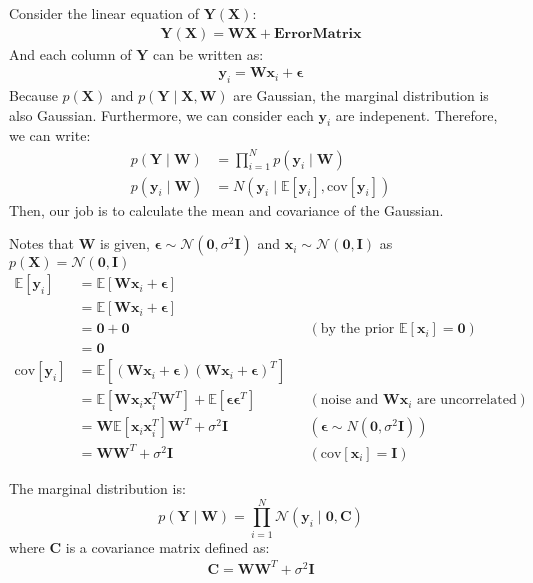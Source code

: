 \documentclass[12pt]{article}
\newenvironment{question}[2][Question]{\begin{trivlist}
\kern10pt
\item[\hskip \labelsep {\bfseries #1}\hskip \labelsep {\bfseries #2.}]}{\end{trivlist}}
\begin{document}
\begin{question}{13}
Consider the linear equation of $\mathbf{Y}(\mathbf{X})$:
  \begin{align*}
    \mathbf{Y}(\mathbf{X}) = \mathbf{W}\mathbf{X} + \bm{ErrorMatrix}
  \end{align*}
And each column of $\mathbf{Y}$ can be written as:
\begin{align*}
  \mathbf{y}_i = \mathbf{W}\mathbf{x}_i + \bm{\epsilon}
\end{align*}
Because $p(\mathbf{X})$ and $p(\mathbf{Y}\mid\mathbf{X}, \mathbf{W})$ are Gaussian, 
 the marginal distribution is also Gaussian.
 Furthermore, we can consider each $\mathbf{y}_i$ are indepenent. Therefore, 
 we can write:
\begin{align*}
  p(\mathbf{Y}\mid\mathbf{W}) &= \prod_{i=1}^{N} p(\mathbf{y}_i\mid\mathbf{W}) \\
  p(\mathbf{y}_i\mid\mathbf{W}) &= N(\mathbf{y}_i\mid \mathbb{E}[\mathbf{y}_i], \text{cov}[\mathbf{y}_i])
\end{align*}
Then, our job is to calculate the mean and covariance of the Gaussian.

Notes that $\mathbf{W}$ is given, $\bm{\epsilon} \sim \mathcal{N}(\mathbf{0}, \sigma^2\mathbf{I})$
 and $\mathbf{x}_i \sim \mathcal{N}(\mathbf{0}, \mathbf{I})$ as 
 $p(\mathbf{X}) = \mathcal{N}(\mathbf{0}, \mathbf{I})$
\begin{align*}
  \mathbb{E}[\mathbf{y}_i] &= \mathbb{E}[\mathbf{W}\mathbf{x}_i + \bm{\epsilon}] \\ 
  &= \mathbb{E}[\mathbf{W}\mathbf{x}_i + \bm{\epsilon}] \\
  &= \mathbf{0} + \mathbf{0} 
                      && (\text{by the prior }\mathbb{E}[\mathbf{x}_i] = \mathbf{0})\\
  &= \mathbf{0} \\
  \text{cov}[\mathbf{y}_i] 
  &= \mathbb{E}[(\mathbf{W}\mathbf{x}_i + \bm{\epsilon})
                (\mathbf{W}\mathbf{x}_i + \bm{\epsilon})^{T}] \\
  &= \mathbb{E}[\mathbf{W}\mathbf{x}_i\mathbf{x}_i^T\mathbf{W}^T]
     + \mathbb{E}[\bm{\epsilon}\bm{\epsilon}^{T}]
     && (\text{noise and }\mathbf{W}\mathbf{x}_i\text{ are uncorrelated}) \\
  &= \mathbf{W}\mathbb{E}[\mathbf{x}_i\mathbf{x}_i^T]\mathbf{W}^T + \sigma^2 \mathbf{I}
     && (\bm{\epsilon} \sim N(\mathbf{0}, \sigma^2\mathbf{I})) \\
  &= \mathbf{W}\mathbf{W}^T + \sigma^2\mathbf{I}
     && (\text{cov}[\mathbf{x}_i] = \mathbf{I})
\end{align*}

The marginal distribution is:
\begin{equation}
  p(\mathbf{Y}\mid\mathbf{W}) 
  = \prod_{i=1}^{N} 
    \mathcal{N}(\mathbf{y}_i\mid\mathbf{0}, \mathbf{C})
\end{equation}
where $\mathbf{C}$ is a covariance matrix defined as:
\begin{align*}
  \mathbf{C} = \mathbf{W}\mathbf{W}^T + \sigma^2\mathbf{I}
\end{align*}
\end{question}
\end{document}
